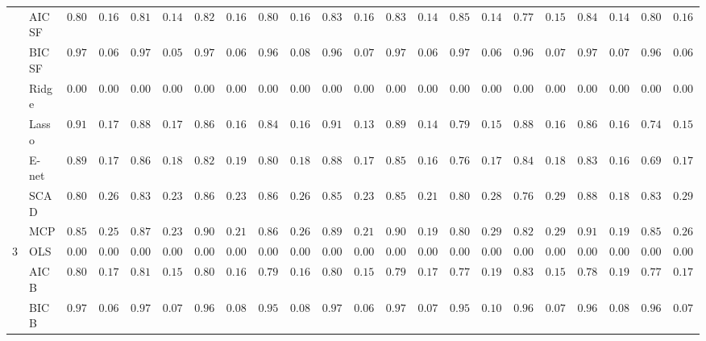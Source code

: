 \begin{tabular}{ll|ll|llllll|llllll|llllll}
 & AIC SF  & $0.8050$ & $0.1659$ & $0.8133$ & $0.1446$ & $0.8217$ & $0.1679$ & $0.8050$ & $0.1642$ & $0.8300$ & $0.1691$ & $0.8333$ & $0.1498$ & $0.8517$ & $0.1439$ & $0.7767$ & $0.1575$ & $0.8467$ & $0.1492$ & $0.8083$ & $0.1698$ \\
 & BIC SF  & $0.9717$ & $0.0672$ & $0.9767$ & $0.0581$ & $0.9750$ & $0.0686$ & $0.9633$ & $0.0840$ & $0.9683$ & $0.0738$ & $0.9783$ & $0.0697$ & $0.9783$ & $0.0611$ & $0.9667$ & $0.0711$ & $0.9733$ & $0.0700$ & $0.9683$ & $0.0699$ \\
 & Ridge  & $0.0000$ & $0.0000$ & $0.0000$ & $0.0000$ & $0.0000$ & $0.0000$ & $0.0000$ & $0.0000$ & $0.0000$ & $0.0000$ & $0.0000$ & $0.0000$ & $0.0000$ & $0.0000$ & $0.0000$ & $0.0000$ & $0.0000$ & $0.0000$ & $0.0000$ & $0.0000$ \\
 & Lasso  & $0.9167$ & $0.1733$ & $0.8833$ & $0.1716$ & $0.8683$ & $0.1612$ & $0.8433$ & $0.1689$ & $0.9167$ & $0.1391$ & $0.8983$ & $0.1496$ & $0.7983$ & $0.1594$ & $0.8883$ & $0.1608$ & $0.8600$ & $0.1653$ & $0.7433$ & $0.1579$ \\
 & E-net  & $0.8983$ & $0.1739$ & $0.8617$ & $0.1820$ & $0.8217$ & $0.1914$ & $0.8000$ & $0.1880$ & $0.8833$ & $0.1733$ & $0.8517$ & $0.1690$ & $0.7617$ & $0.1745$ & $0.8467$ & $0.1815$ & $0.8317$ & $0.1667$ & $0.6917$ & $0.1763$ \\
 & SCAD  & $0.8017$ & $0.2624$ & $0.8333$ & $0.2369$ & $0.8650$ & $0.2329$ & $0.8600$ & $0.2635$ & $0.8550$ & $0.2305$ & $0.8583$ & $0.2137$ & $0.8050$ & $0.2873$ & $0.7683$ & $0.2977$ & $0.8850$ & $0.1891$ & $0.8317$ & $0.2906$ \\
 & MCP  & $0.8567$ & $0.2518$ & $0.8700$ & $0.2388$ & $0.9033$ & $0.2121$ & $0.8650$ & $0.2635$ & $0.8933$ & $0.2165$ & $0.9050$ & $0.1943$ & $0.8067$ & $0.2956$ & $0.8217$ & $0.2933$ & $0.9100$ & $0.1901$ & $0.8533$ & $0.2609$ \\\hline
3 & OLS  & $0.0000$ & $0.0000$ & $0.0000$ & $0.0000$ & $0.0000$ & $0.0000$ & $0.0000$ & $0.0000$ & $0.0000$ & $0.0000$ & $0.0000$ & $0.0000$ & $0.0000$ & $0.0000$ & $0.0000$ & $0.0000$ & $0.0000$ & $0.0000$ & $0.0000$ & $0.0000$ \\
 & AIC B  & $0.8017$ & $0.1752$ & $0.8150$ & $0.1587$ & $0.8033$ & $0.1613$ & $0.7950$ & $0.1639$ & $0.8017$ & $0.1584$ & $0.7917$ & $0.1731$ & $0.7783$ & $0.1925$ & $0.8333$ & $0.1553$ & $0.7817$ & $0.1905$ & $0.7750$ & $0.1731$ \\
 & BIC B  & $0.9717$ & $0.0672$ & $0.9717$ & $0.0713$ & $0.9650$ & $0.0864$ & $0.9583$ & $0.0898$ & $0.9700$ & $0.0686$ & $0.9717$ & $0.0713$ & $0.9500$ & $0.1019$ & $0.9650$ & $0.0796$ & $0.9633$ & $0.0840$ & $0.9650$ & $0.0796$ \\

\end{tabular}
